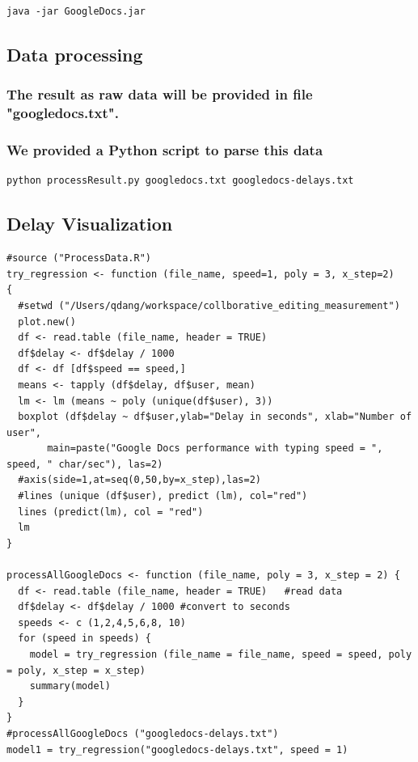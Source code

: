\documentclass[10pt]{article}
\begin{document}
\begin{verbatim}
java -jar GoogleDocs.jar
\end{verbatim}

\subsection{Data processing}
\label{sec-2-3}

\subsubsection{The result as raw data will be provided in file "googledocs.txt".}
\label{sec-2-3-1}
\subsubsection{We provided a Python script to parse this data}
\label{sec-2-3-2}

\begin{verbatim}
python processResult.py googledocs.txt googledocs-delays.txt
\end{verbatim}

\subsection{Delay Visualization}
\label{sec-2-4}

\begin{verbatim}
#source ("ProcessData.R")
try_regression <- function (file_name, speed=1, poly = 3, x_step=2)
{
  #setwd ("/Users/qdang/workspace/collborative_editing_measurement")
  plot.new()
  df <- read.table (file_name, header = TRUE)
  df$delay <- df$delay / 1000
  df <- df [df$speed == speed,]
  means <- tapply (df$delay, df$user, mean)
  lm <- lm (means ~ poly (unique(df$user), 3))
  boxplot (df$delay ~ df$user,ylab="Delay in seconds", xlab="Number of user", 
	   main=paste("Google Docs performance with typing speed = ", speed, " char/sec"), las=2)
  #axis(side=1,at=seq(0,50,by=x_step),las=2)
  #lines (unique (df$user), predict (lm), col="red")
  lines (predict(lm), col = "red")
  lm
}

processAllGoogleDocs <- function (file_name, poly = 3, x_step = 2) {
  df <- read.table (file_name, header = TRUE)   #read data
  df$delay <- df$delay / 1000 #convert to seconds
  speeds <- c (1,2,4,5,6,8, 10)
  for (speed in speeds) {
    model = try_regression (file_name = file_name, speed = speed, poly = poly, x_step = x_step)
    summary(model)
  }
}
#processAllGoogleDocs ("googledocs-delays.txt")
model1 = try_regression("googledocs-delays.txt", speed = 1)
\end{verbatim}
\end{document}
